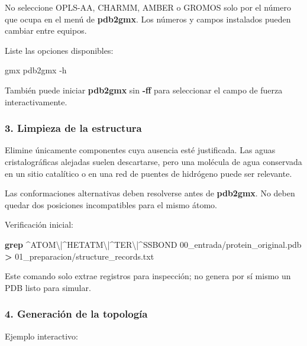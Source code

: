 \documentclass[
  spanish,
  11pt,
  a4paper]{article}
\newenvironment{Shaded}{\begin{snugshade}}{\end{snugshade}}
\newcommand{\AttributeTok}[1]{\textcolor[rgb]{0.13,0.29,0.53}{#1}}
\newcommand{\ExtensionTok}[1]{#1}
\newcommand{\FunctionTok}[1]{\textcolor[rgb]{0.13,0.29,0.53}{\textbf{#1}}}
\newcommand{\NormalTok}[1]{#1}
\newcommand{\OperatorTok}[1]{\textcolor[rgb]{0.81,0.36,0.00}{\textbf{#1}}}
\newcommand{\StringTok}[1]{\textcolor[rgb]{0.31,0.60,0.02}{#1}}
\begin{document}
No seleccione OPLS-AA, CHARMM, AMBER o GROMOS solo por el número que
ocupa en el menú de \textbf{pdb2gmx}. Los números y campos instalados
pueden cambiar entre equipos.

Liste las opciones disponibles:

\begin{Shaded}
\begin{Highlighting}[]
\ExtensionTok{gmx}\NormalTok{ pdb2gmx }\AttributeTok{{-}h}
\end{Highlighting}
\end{Shaded}

También puede iniciar \textbf{pdb2gmx} sin \textbf{-ff} para seleccionar
el campo de fuerza interactivamente.

\subsubsection{3. Limpieza de la
estructura}\label{limpieza-de-la-estructura}

Elimine únicamente componentes cuya ausencia esté justificada. Las aguas
cristalográficas alejadas suelen descartarse, pero una molécula de agua
conservada en un sitio catalítico o en una red de puentes de hidrógeno
puede ser relevante.

Las conformaciones alternativas deben resolverse antes de
\textbf{pdb2gmx}. No deben quedar dos posiciones incompatibles para el
mismo átomo.

Verificación inicial:

\begin{Shaded}
\begin{Highlighting}[]
\FunctionTok{grep} \StringTok{\textquotesingle{}\^{}ATOM\textbackslash{}|\^{}HETATM\textbackslash{}|\^{}TER\textbackslash{}|\^{}SSBOND\textquotesingle{}}\NormalTok{ 00\_entrada/protein\_original.pdb     }\OperatorTok{\textgreater{}}\NormalTok{ 01\_preparacion/structure\_records.txt}
\end{Highlighting}
\end{Shaded}

Este comando solo extrae registros para inspección; no genera por sí
mismo un PDB listo para simular.

\subsubsection{4. Generación de la
topología}\label{generaciuxf3n-de-la-topologuxeda}

Ejemplo interactivo:
\end{document}
